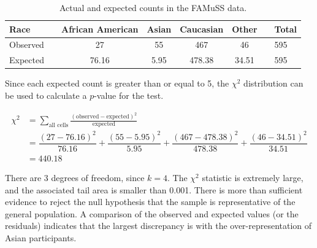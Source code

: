 \begin{example}
\begin{table}[h]
	\centering
	\begin{tabular}{ll ccc c ll}
		\hline
		Race	 & \hspace{2mm} & African American & Asian & Caucasian & Other & \hspace{2mm} & Total \\
		\hline
		Observed &	& 27 & 55 & 467 & 46 & & 595 \\
		Expected & 	& 76.16 & 5.95 & 478.38 & 34.51 & & 595 \\
		\hline
	\end{tabular}
	\caption{Actual and expected counts in the FAMuSS data.}
    \label{actualExpectedRacialCountsFamuss}
\end{table}	

Since each expected count is greater than or equal to 5,  the $\chi^2$ distribution can be used to calculate a $p$-value for the test.

\begin{align*}
\chi^2 &= \sum_{\text{all cells}} \frac{(\text{observed} - \text{expected})^2}{\text{expected}} \\
&= \dfrac{(27-76.16)^2}{76.16} + \dfrac{(55-5.95)^2}{5.95} + \dfrac{(467-478.38)^2}{478.38} + \dfrac{(46-34.51)^2}{34.51} \\
&=440.18
\end{align*}	

There are 3 degrees of freedom, since $k = 4$. The $\chi^2$ statistic is extremely large, and the associated tail area is smaller than 0.001. There is more than sufficient evidence to reject the null hypothesis that the sample is representative of the general population. A comparison of the observed and expected values (or the residuals) indicates that the largest discrepancy is with the over-representation of Asian participants.
\end{example}


